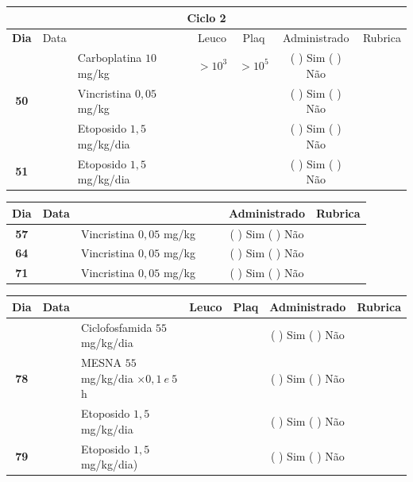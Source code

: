 \documentclass[11pt,a4paper,oldfontcommands]{memoir}
\begin{document}
\begin{center}
\begin{longtable}{p{1cm}c|p{5cm}|p{1.5cm}p{1.5cm}|c|c}
	\hline
	\multicolumn{7}{c}{Ciclo 2} \\
	\hline
	\multicolumn{1}{c|}{\multirow{1}{*}{\textbf{Dia}}}&{Data}&{}&\multicolumn{1}{c|}{Leuco}&\multicolumn{1}{c|}{Plaq}&{Administrado}&{Rubrica} \\
    \hline
    \multicolumn{1}{c|}{\multirow{3}{*}{\textbf{50}}}&\multirow{2}{*}{}&{Carboplatina \(10\) mg/kg}&\multicolumn{1}{c|}{\(>10^3\)}&\multicolumn{1}{c|}{\(>10^5\)}&{(  ) Sim (  ) Não}&\\
    \cline{4-5}
    \multicolumn{1}{c|}{}&&{Vincristina \(0,05\) mg/kg}&\multicolumn{1}{c|}{}&&{(  ) Sim (  ) Não}&\\
    \cline{4-5}
    \multicolumn{1}{c|}{}&\multirow{1}{*}{}&{Etoposido \(1,5\) mg/kg/dia}&{}&&{(  ) Sim (  ) Não}&\\
    \cline{1-3}\cline{6-6}
    \multicolumn{1}{c|}{\textbf{51}}&\multirow{1}{*}{}&{Etoposido \(1,5\) mg/kg/dia}&{}&&{(  ) Sim (  ) Não}&\\
    \hline
\end{longtable}
\begin{longtable}{p{1cm}c|p{4cm}|p{2cm}p{2cm}|c|c}
	\hline
	\multicolumn{1}{c|}{\multirow{1}{*}{\textbf{Dia}}}&{Data}&{}&{}&&{Administrado}&{Rubrica} \\
    \hline
    \multicolumn{1}{c|}{\textbf{57}}&&{Vincristina \(0,05\) mg/kg}&\multicolumn{1}{c}{}&&{(  ) Sim (  ) Não}&\\
    \hline
    \multicolumn{1}{c|}{\textbf{64}}&&{Vincristina \(0,05\) mg/kg}&\multicolumn{1}{c}{}&&{(  ) Sim (  ) Não}&\\
    \hline
    \multicolumn{1}{c|}{\textbf{71}}&&{Vincristina \(0,05\) mg/kg}&\multicolumn{1}{c}{}&&{(  ) Sim (  ) Não}&\\
    \hline
\end{longtable}
\begin{longtable}{p{1cm}c|p{5cm}|p{1.5cm}p{1.5cm}|c|c}
	\hline
	\multicolumn{1}{c|}{\multirow{1}{*}{\textbf{Dia}}}&{Data}&{}&\multicolumn{1}{c|}{Leuco}&\multicolumn{1}{c|}{Plaq}&{Administrado}&{Rubrica} \\
    \hline
    \multicolumn{1}{c|}{\multirow{3}{*}{\textbf{78}}}&&{Ciclofosfamida \(55\) mg/kg/dia}&\multicolumn{1}{c|}{}&&{(  ) Sim (  ) Não}&\\
    \cline{4-5}
    \multicolumn{1}{c|}{}&&{MESNA \(55\) mg/kg/dia \(\times 0,1 \:e\: 5\)h}&&&{(  ) Sim (  ) Não}&\\
    \multicolumn{1}{c|}{}&&{Etoposido \(1,5\) mg/kg/dia}&&&{(  ) Sim (  ) Não}&\\
    \hline
    \multicolumn{1}{c|}{\multirow{1}{*}{\textbf{79}}}&&{Etoposido \(1,5\) mg/kg/dia)}&{}&&{(  ) Sim (  ) Não}&\\
    \hline
\end{longtable}
\end{center}
\end{document}
